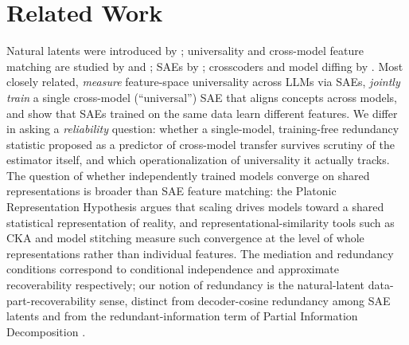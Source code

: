 \documentclass[11pt]{article}
\begin{document}
\section{Related Work}
\label{sec:related}
Natural latents were introduced by \citet{wentworth2025natural}; universality and cross-model feature
matching are studied by \citet{olah2020zoom} and \citet{towards2024universality}; SAEs by
\citet{bricken2023monosemanticity}; crosscoders and model diffing by \citet{lindsey2024crosscoders}. Most
closely related, \citet{lan2024quantifying} \emph{measure} feature-space universality across LLMs via
SAEs, \citet{thasarathan2025universal} \emph{jointly train} a single cross-model (``universal'') SAE that
aligns concepts across models, and \citet{paulo2025different} show that SAEs trained on the same data
learn different features. We differ in asking a \emph{reliability} question: whether a single-model,
training-free redundancy statistic proposed as a predictor of cross-model transfer survives scrutiny of
the estimator itself, and which operationalization of universality it actually tracks. The question of
whether independently trained models converge on shared representations is broader than SAE feature
matching: the Platonic Representation Hypothesis \citep{huh2024platonic} argues that scaling drives
models toward a shared statistical representation of reality, and representational-similarity tools such
as CKA and model stitching \citep{kornblith2019similarity} measure such convergence at the level of whole
representations rather than individual features. The mediation and redundancy conditions correspond to
conditional independence \citep{pearl2009causality} and approximate recoverability
\citep{cover2006elements} respectively; our notion of redundancy is the natural-latent
data-part-recoverability sense, distinct from decoder-cosine redundancy among SAE latents and from the
redundant-information term of Partial Information Decomposition \citep{williams2010nonnegative}.
\end{document}
